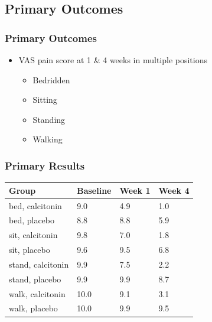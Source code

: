 \documentclass{beamer}
\begin{document}
\subsection{Primary Outcomes}
\begin{frame}
	\frametitle{Primary Outcomes}
	\begin{itemize}
		\item  VAS pain score at 1 \& 4 weeks in multiple positions
		\begin{itemize}
			\item Bedridden
			\item Sitting
			\item Standing
			\item Walking
		\end{itemize}
	\end{itemize}
\end{frame}
\begin{frame}
	\frametitle{Primary Results}
		\centering
		\begin{tabular}{|l|l|l|l|}
			\hline
			\textbf{Group} & \textbf{Baseline} & \textbf{Week 1} & \textbf{Week 4}
			\\
			\hline
			bed, calcitonin & 9.0 & 4.9 & 1.0
			\\
			bed, placebo & 8.8 & 8.8 & 5.9
			\\
			\hline
			sit, calcitonin & 9.8 & 7.0 & 1.8
			\\
			sit, placebo & 9.6 & 9.5 & 6.8 
			\\
			\hline
			stand, calcitonin & 9.9 & 7.5 & 2.2
			\\
			stand, placebo & 9.9 & 9.9 & 8.7
			\\
			\hline
			walk, calcitonin & 10.0 & 9.1 & 3.1
			\\
			walk, placebo & 10.0 & 9.9 & 9.5
			\\
			\hline
		\end{tabular}
\end{frame}
\end{document}
